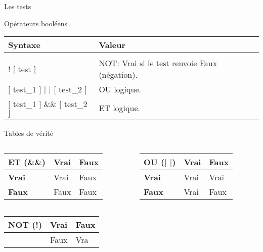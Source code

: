 \begin{frame}{Les tests}
  \begin{block}{Opérateurs booléens}
    \begin{center}
      \begin{tabular}{ll}
        \hline
        Syntaxe&Valeur\\
        \hline\\
        ! $[$ test $]$&NOT: Vrai si le test renvoie Faux (négation).\\[2pt]
        $[$ test\_1 $]$ $|$ $|$ $[$ test\_2 $]$&OU logique.\\[2pt]
        $[$ test\_1 $]$ \&\& $[$ test\_2 $]$&ET logique.\\[2pt]
        \hline
      \end{tabular}
    \end{center}
  \end{block}
  \begin{block}{Tables de vérité}
    \begin{columns}
      \begin{column}{5.5cm}
        \begin{center}
          \begin{tabular}{|l|l|l|}
            \hline
            \textbf{ET (\&\&)}&\textbf{Vrai}&\textbf{Faux}\\
            \hline
            \textbf{Vrai}&Vrai&Faux\\
            \hline
            \textbf{Faux}&Faux&Faux\\
            \hline
          \end{tabular}
        \end{center}
      \end{column}
      \begin{column}{5.5cm}
        \begin{center}
          \begin{tabular}{|l|l|l|}
            \hline
            \textbf{OU ($|$ $|$)}&\textbf{Vrai}&\textbf{Faux}\\
            \hline
            \textbf{Vrai}&Vrai&Vrai\\
            \hline
            \textbf{Faux}&Vrai&Faux\\
            \hline
          \end{tabular}
        \end{center}
      \end{column}
    \end{columns}
    \begin{center}
      \begin{tabular}{|l|l|l|}
        \hline
        \textbf{NOT (!)}&\textbf{Vrai}&\textbf{Faux}\\
        \hline
        &Faux&Vra\\
        \hline
      \end{tabular}
    \end{center}
  \end{block}
\end{frame}

